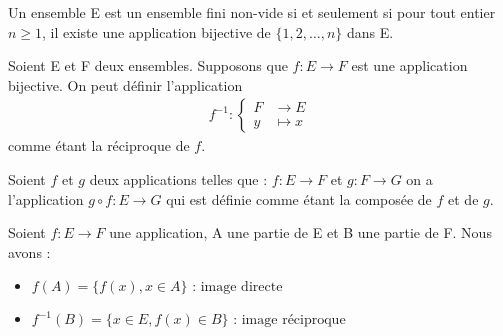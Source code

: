     \begin{graybox}
    	\begin{definition}
    		Un ensemble E est un ensemble fini non-vide si et seulement si pour tout entier $n \geq 1$, il existe une application bijective de $\{1, 2, \ldots, n\}$ dans E.
    	\end{definition}
    \end{graybox}

    \begin{graybox}
    	\begin{definition}
    		Soient E et F deux ensembles. Supposons que $f:E \to F$ est une application bijective. On peut définir l'application 
    		\begin{align*}
    			f^{-1} : 
    			\begin{cases}
    				F &\to E \\
    				y &\mapsto x
    			\end{cases}
    		\end{align*}
    		comme étant la réciproque de $f$.
    	\end{definition}
    \end{graybox}

    \begin{graybox}
    	\begin{definition}[Composition]
    		Soient $f$ et $g$ deux applications telles que :
    		$f:E \to F$ et $g:F \to G$ on a l'application $g \circ f : E \to G$ qui est définie comme étant la composée de $f$ et de $g$.
    	\end{definition}
    \end{graybox}

    \begin{graybox}
    	\begin{definition}
    		Soient $f:E \to F$ une application, A une partie de E et B une partie de F. Nous avons :
    		\begin{itemize}
    			\item $f(A) = \{f(x), x \in A\} \text{ : image directe}$
    			\item $f^{-1}(B) = \{x \in E, f(x) \in B\} \text{ : image réciproque}$
    		\end{itemize}
    	\end{definition}
    \end{graybox}


